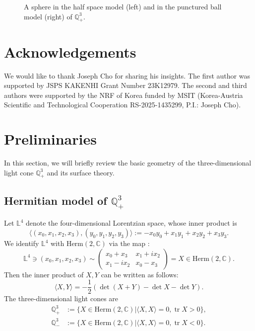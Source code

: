 \documentclass[12pt,reqno]{amsart}
\theoremstyle{plain} %
\theoremstyle{definition}
\numberwithin{equation}{section}
\newcommand{\hermtwo}{\mathrm{Herm}(2,\mathbb{C})}
\newcommand{\qthreep}{\mathbb{Q}^3_+}
\newcommand{\qthreem}{\mathbb{Q}^3_-}
\newcommand{\lfour}{\mathbb{L}^4}
\newcommand{\tr}[1]{\operatorname{tr} #1}
\begin{document}
\begin{figure}[t]
\begin{center}
%
  \hspace{1cm}
	\caption{ A sphere in the half space model (left)
and in the punctured ball model (right) of $\qthreep$.}
\label{Fig:20260937PM}
\end{center}
\end{figure}


\section*{Acknowledgements}

We would like to thank Joseph Cho for sharing his insights. The first author was supported by JSPS KAKENHI Grant Number 23K12979. The second and third authors were supported by the NRF of Korea funded by MSIT (Korea-Austria Scientific and Technological Cooperation RS-2025-1435299, P.I.: Joseph Cho).

\section{Preliminaries}\label{Sec.2}

In this section, we will briefly review the basic geometry of the three-dimensional light cone $\qthreep$ and its surface
theory.

\subsection{Hermitian model of $\qthreep$}

Let $\lfour$ denote the four-dimensional Lorentzian space,  whose inner product is
\[
	\langle (x_0, x_1, x_2, x_3), (y_0, y_1, y_2, y_3) \rangle := - x_0 y_0 + x_1 y_1 + x_2 y_2 + x_3 y_3.
\]
We identify $\mathbb{L}^4$ with $\hermtwo$ via the map :
\[
	\lfour \ni (x_0, x_1, x_2, x_3) \sim \begin{pmatrix} x_0 + x_3 & x_1 + i x_2 \\ x_1 - i x_2 & x_0 - x_3 \end{pmatrix} = X \in \hermtwo.
\]
Then the inner product of $X, Y$ can be written as follows:
\[
	\langle X, Y \rangle = -\frac{1}{2} \left(\det{(X+Y)} - \det{X} - \det{Y} \right).
\]
The three-dimensional light cones are
\begin{align*}
	\qthreep & := \{ X \in \hermtwo | \langle X, X \rangle = 0, \tr{X} > 0 \}, \\
	\qthreem & := \{ X \in \hermtwo | \langle X, X \rangle = 0, \tr{X} < 0 \}.
\end{align*}
\end{document}
